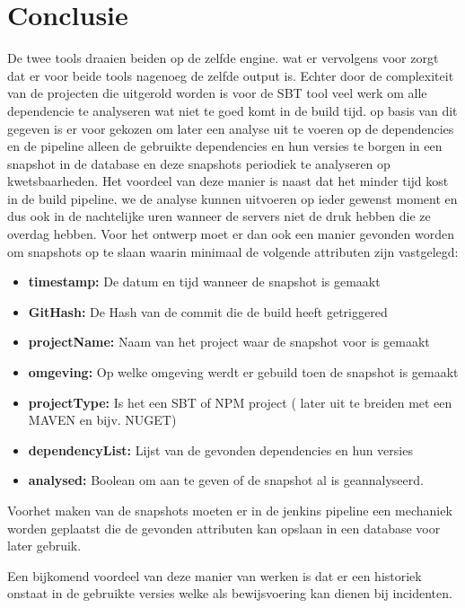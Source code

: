 \section{Conclusie}\label{sec:conclusie}
De twee tools draaien beiden op de zelfde engine. wat er vervolgens voor zorgt dat er voor beide tools nagenoeg de zelfde output is. Echter door de complexiteit van de projecten die uitgerold worden is voor de SBT tool veel werk om alle dependencie te analyseren wat niet te goed komt in de build tijd. op basis van dit gegeven is er voor gekozen om later een analyse uit te voeren op de dependencies en de pipeline alleen de gebruikte dependencies en hun versies te borgen in een snapshot in de database en deze snapshots periodiek te analyseren op kwetsbaarheden. Het voordeel van deze manier is naast dat het minder tijd kost in de build pipeline. we de analyse kunnen uitvoeren op ieder gewenst moment en dus ook in de nachtelijke uren wanneer de servers niet de druk hebben die ze overdag hebben. Voor het ontwerp moet er dan ook een manier gevonden worden om snapshots op te slaan waarin minimaal de volgende attributen zijn vastgelegd:
\begin{itemize}
    \item \textbf{timestamp:} De datum en tijd wanneer de snapshot is gemaakt
    \item \textbf{GitHash:} De Hash van de commit die de build heeft getriggered
    \item \textbf{projectName:} Naam van het project waar de snapshot voor is gemaakt
    \item \textbf{omgeving:} Op welke omgeving werdt er gebuild toen de snapshot is gemaakt
    \item \textbf{projectType:} Is het een SBT of NPM project ( later uit te breiden met een MAVEN en bijv. NUGET)
    \item \textbf{dependencyList:} Lijst van de gevonden dependencies en hun versies
    \item \textbf{analysed:} Boolean om aan te geven of de snapshot al is geannalyseerd.
\end{itemize}

Voorhet maken van de snapshots moeten er in de jenkins pipeline een mechaniek worden geplaatst die de gevonden attributen kan opslaan in een database voor later gebruik.

Een bijkomend voordeel van deze manier van werken is dat er een historiek onstaat in de gebruikte versies welke als bewijsvoering kan dienen bij incidenten.
